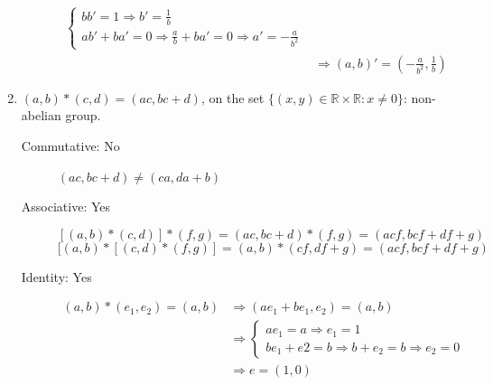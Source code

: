 \documentclass{article}
\begin{document}
\begin{enumerate}
\begin{description}
\begin{equation*}
\begin{split}
\begin{cases}
                                                                                            bb' = 1 \Rightarrow b' = \frac{1}{b} \\
                                                                                            ab' + ba' = 0 \Rightarrow \frac{a}{b} + ba' = 0 \Rightarrow a' = -\frac{a}{b^2}
                                                                                     \end{cases} \\
                                                                       & \Rightarrow (a, b)' = \left(-\frac{a}{b^2}, \frac{1}{b}\right)
                    \end{split}
                \end{equation*}
        \end{description}
    \item $(a, b) * (c, d) = (ac, bc + d)$, on the set $\{(x, y) \in \mathbb{R} \times \mathbb{R}: x \ne 0\}$: non-abelian group.
        \begin{description}
            \item [Commutative: No] $(ac, bc + d) \ne (ca, da + b)$
            \item [Associative: Yes]
                $$[(a, b) * (c, d)] * (f, g) = (ac, bc + d) * (f, g) = (acf, bcf + df + g)$$
                $$[(a, b) * [(c, d) * (f, g)] = (a, b) * (cf, df + g) = (acf, bcf + df + g)$$
            \item [Identity: Yes]
                \begin{equation*}
                    \begin{split}
                        (a, b) * (e_1, e_2) = (a, b) & \Rightarrow (ae_1 + be_1, e_2) = (a, b) \\
                                                    & \Rightarrow  \begin{cases}
                                                                        ae_1 = a \Rightarrow e_1 = 1 \\
                                                                        be_1 + e2 = b \Rightarrow b + e_2 = b \Rightarrow e_2 = 0
                                                                   \end{cases} \\
                                                    & \Rightarrow e = (1, 0)
                    \end{split}
                \end{equation*}

\end{description}
\end{enumerate}
\end{document}
